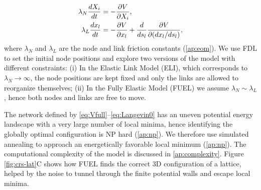 \documentclass[endfloats,nofootinbib,preprint,floatfix,titlepage,superscriptaddress,linenumbers]{revtex4-1} %
\begin{document}
\begin{align}
    \lambda_N {dX_i\over dt} &= -{\ro V \over \ro X_i} %
    \label{eq:nodes},\\
    \lambda_L {dx_l \over dt} & =  -{\ro V \over \ro x_l} + {d\over ds_l} {\ro V \over \ro (dx_l /ds_l)}   \label{eq:Langevin0},
\end{align}
where $\lambda_N$ and $\lambda_L$ are the node and link friction constants (\ref{ap:eom}). 
We use FDL to set the initial node positions and explore two versions of the model with different constraints: 
(i) In the Elastic Link Model (ELI), which corresponds to $\lambda_N\to \infty$, the node positions are kept fixed and only the links are allowed to reorganize themselves; 
(ii) In the Fully Elastic Model (FUEL) we assume $\lambda_N \sim \lambda_L$, hence both nodes and links are free to move. 

The network defined by \eqref{eq:Vfull}--\eqref{eq:Langevin0} has an uneven potential energy landscape \cite{bouchaud1998out} %
with a very large number of local minima, hence identifying the globally optimal configuration is NP hard (\ref{ap:np}).
We therefore use simulated annealing \cite{kirkpatrick1987optimization} %
to approach an energetically favorable local minimum (\ref{ap:np}).
The computational complexity of  the model is discussed in \ref{ap:complexity}.
Figure \ref{fig:crs-lat}C shows how FUEL finds the correct 3D configuration of a lattice, %
helped by the noise to tunnel through the finite potential walls and escape local minima. 
\end{document}
